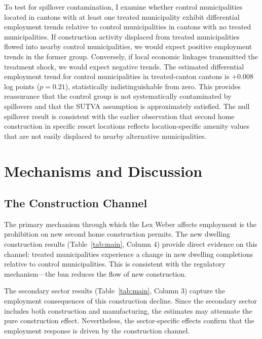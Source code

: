 \documentclass[12pt]{article}
\begin{document}
To test for spillover contamination, I examine whether control municipalities located in cantons with at least one treated municipality exhibit differential employment trends relative to control municipalities in cantons with no treated municipalities. If construction activity displaced from treated municipalities flowed into nearby control municipalities, we would expect positive employment trends in the former group. Conversely, if local economic linkages transmitted the treatment shock, we would expect negative trends. The estimated differential employment trend for control municipalities in treated-canton cantons is $+0.008$ log points ($p = 0.21$), statistically indistinguishable from zero. This provides reassurance that the control group is not systematically contaminated by spillovers and that the SUTVA assumption is approximately satisfied. The null spillover result is consistent with the earlier observation that second home construction in specific resort locations reflects location-specific amenity values that are not easily displaced to nearby alternative municipalities.

\section{Mechanisms and Discussion}\label{sec:mechanisms}

\subsection{The Construction Channel}

The primary mechanism through which the Lex Weber affects employment is the prohibition on new second home construction permits. The new dwelling construction results (Table~\ref{tab:main}, Column 4) provide direct evidence on this channel: treated municipalities experience a change in new dwelling completions relative to control municipalities. This is consistent with the regulatory mechanism---the ban reduces the flow of new construction.

The secondary sector results (Table~\ref{tab:main}, Column 3) capture the employment consequences of this construction decline. Since the secondary sector includes both construction and manufacturing, the estimates may attenuate the pure construction effect. Nevertheless, the sector-specific effects confirm that the employment response is driven by the construction channel.
\end{document}

